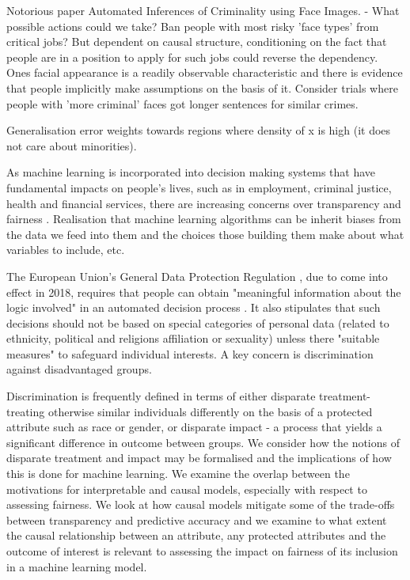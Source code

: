 Notorious paper Automated Inferences of Criminality using Face Images. - What possible actions could we take? Ban people with most risky 'face types' from critical jobs? But dependent on causal structure, conditioning on the fact that people are in a position to apply for such jobs could reverse the dependency. Ones facial appearance is a readily observable characteristic and there is evidence that people implicitly make assumptions on the basis of it. Consider trials where people with 'more criminal' faces got longer sentences for similar crimes. 


Generalisation error weights towards regions where density of x is high (it does not care about minorities). 

As machine learning is incorporated into decision making systems that have fundamental impacts on people’s lives, such as in employment, criminal justice, health and financial services, there are increasing concerns over transparency and fairness \citep{WMD, etc}. Realisation that machine learning algorithms can be inherit biases from the data we feed into them and the choices those building them make about what variables to include, etc. 

The European Union’s General Data Protection Regulation \citep{Goodman2016}, due to come into effect in 2018, requires that people can obtain "meaningful information about the logic involved" in an automated decision process . It also stipulates that such decisions should not be based on special categories of personal data (related to ethnicity, political and religions affiliation or sexuality) unless there "suitable measures" to safeguard individual interests. A key concern is discrimination against disadvantaged groups. 

Discrimination is frequently defined in terms of either disparate treatment- treating otherwise similar individuals differently on the basis of a protected attribute such as race or gender, or disparate impact - a process that yields a significant difference in outcome between groups. We consider how the notions of disparate treatment and impact may be formalised and the implications of how this is done for machine learning. We examine the overlap between the motivations for interpretable and causal models, especially with respect to assessing fairness. We look at how causal models mitigate some of the trade-offs between transparency and predictive accuracy and we examine to what extent the causal relationship between an attribute, any protected attributes and the outcome of interest is relevant to assessing the impact on fairness of its inclusion in a machine learning model.


